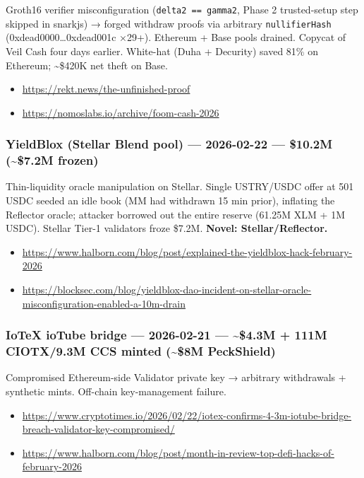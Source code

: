 Groth16 verifier misconfiguration (\texttt{delta2\ ==\ gamma2}, Phase 2 trusted-setup step skipped in snarkjs) → forged withdraw proofs via arbitrary \texttt{nullifierHash} (0xdead0000\ldots0xdead001c ×29+). Ethereum + Base pools drained. Copycat of Veil Cash four days earlier. White-hat (Duha + Decurity) saved 81\% on Ethereum; \textasciitilde\$420K net theft on Base.

\begin{itemize}
\tightlist
\item
  \url{https://rekt.news/the-unfinished-proof}
\item
  \url{https://nomoslabs.io/archive/foom-cash-2026}
\end{itemize}

\subsubsection{YieldBlox (Stellar Blend pool) --- 2026-02-22 --- \$10.2M (\textasciitilde\$7.2M frozen)}\label{yieldblox-stellar-blend-pool-2026-02-22-10.2m-7.2m-frozen}

Thin-liquidity oracle manipulation on Stellar. Single USTRY/USDC offer at 501 USDC seeded an idle book (MM had withdrawn 15 min prior), inflating the Reflector oracle; attacker borrowed out the entire reserve (61.25M XLM + 1M USDC). Stellar Tier-1 validators froze \$7.2M. \textbf{Novel: Stellar/Reflector.}

\begin{itemize}
\tightlist
\item
  \url{https://www.halborn.com/blog/post/explained-the-yieldblox-hack-february-2026}
\item
  \url{https://blocksec.com/blog/yieldblox-dao-incident-on-stellar-oracle-misconfiguration-enabled-a-10m-drain}
\end{itemize}

\subsubsection{IoTeX ioTube bridge --- 2026-02-21 --- \textasciitilde\$4.3M + 111M CIOTX/9.3M CCS minted (\textasciitilde\$8M PeckShield)}\label{iotex-iotube-bridge-2026-02-21-4.3m-111m-ciotx9.3m-ccs-minted-8m-peckshield}

Compromised Ethereum-side Validator private key → arbitrary withdrawals + synthetic mints. Off-chain key-management failure.

\begin{itemize}
\tightlist
\item
  \url{https://www.cryptotimes.io/2026/02/22/iotex-confirms-4-3m-iotube-bridge-breach-validator-key-compromised/}
\item
  \url{https://www.halborn.com/blog/post/month-in-review-top-defi-hacks-of-february-2026}
\end{itemize}


